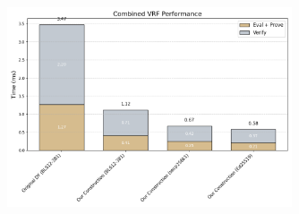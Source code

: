 \begin{figure}[ht]
    \centering
    \begin{minipage}{\textwidth}
        \centering
        \includegraphics[width=0.75\textwidth]{figures/chap4_public_vrf_combined.png}
    \end{minipage}
    

\end{figure}
